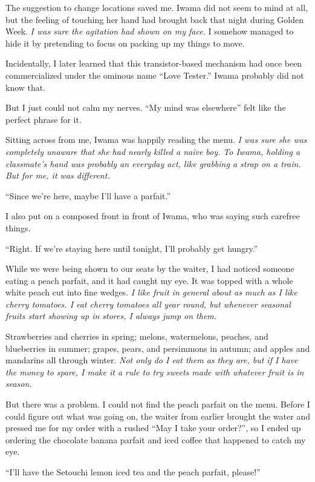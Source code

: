 \documentclass[
    a4paper,
    12pt,
    twoside,
    openany,
    UTF8,
    fontset=windows
]{ctexbook}
\begin{document}
The suggestion to change locations saved me. Iwama did not seem to mind at all, but the feeling of touching her hand had brought back that night during Golden Week. \textit{I was sure the agitation had shown on my face.} I somehow managed to hide it by pretending to focus on packing up my things to move.

Incidentally, I later learned that this transistor-based mechanism had once been commercialized under the ominous name ``Love Tester.'' Iwama probably did not know that.

But I just could not calm my nerves. ``My mind was elsewhere'' felt like the perfect phrase for it.

Sitting across from me, Iwama was happily reading the menu. \textit{I was sure she was completely unaware that she had nearly killed a naive boy. To Iwama, holding a classmate's hand was probably an everyday act, like grabbing a strap on a train. But for me, it was different.}

``Since we're here, maybe I'll have a parfait.''

I also put on a composed front in front of Iwama, who was saying such carefree things.

``Right. If we're staying here until tonight, I'll probably get hungry.''

While we were being shown to our seats by the waiter, I had noticed someone eating a peach parfait, and it had caught my eye. It was topped with a whole white peach cut into fine wedges. \textit{I like fruit in general about as much as I like cherry tomatoes. I eat cherry tomatoes all year round, but whenever seasonal fruits start showing up in stores, I always jump on them.}

Strawberries and cherries in spring; melons, watermelons, peaches, and blueberries in summer; grapes, pears, and persimmons in autumn; and apples and mandarins all through winter. \textit{Not only do I eat them as they are, but if I have the money to spare, I make it a rule to try sweets made with whatever fruit is in season.}

But there was a problem. I could not find the peach parfait on the menu. Before I could figure out what was going on, the waiter from earlier brought the water and pressed me for my order with a rushed ``May I take your order?'', so I ended up ordering the chocolate banana parfait and iced coffee that happened to catch my eye.

``I'll have the Setouchi lemon iced tea and the peach parfait, please!''
\end{document}
